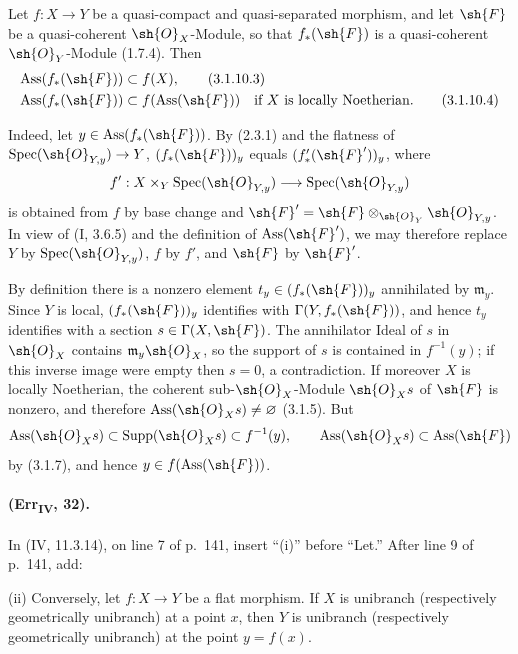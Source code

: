 \begin{remark}[3.1.10.2]
Let $f:X\to Y$ be a quasi-compact and quasi-separated morphism, and let
$\sh{F}$ be a quasi-coherent $\sh{O}_X$-Module, so that $f_*(\sh{F})$
is a quasi-coherent $\sh{O}_Y$-Module (1.7.4).  Then
\begin{align}
 \operatorname{Ass}(f_*(\sh{F}))&\subset f(X), \tag{3.1.10.3}\\
 \operatorname{Ass}(f_*(\sh{F}))&\subset f(\operatorname{Ass}(\sh{F}))
       \quad\text{if $X$ is locally Noetherian}. \tag{3.1.10.4}
\end{align}

Indeed, let $y\in\operatorname{Ass}(f_*(\sh{F}))$.  By (2.3.1) and the
flatness of $\operatorname{Spec}(\sh{O}_{Y,y})\to Y$,
$(f_*(\sh{F}))_y$ equals $(f'_*(\sh{F}'))_y$, where
\[
 f':X\times_Y\operatorname{Spec}(\sh{O}_{Y,y})
       \longrightarrow\operatorname{Spec}(\sh{O}_{Y,y})
\]
is obtained from $f$ by base change and
$\sh{F}'=\sh{F}\otimes_{\sh{O}_Y}\sh{O}_{Y,y}$.  In view of (I, 3.6.5)
and the definition of $\operatorname{Ass}(\sh{F}')$, we may therefore
replace $Y$ by $\operatorname{Spec}(\sh{O}_{Y,y})$, $f$ by $f'$, and
$\sh{F}$ by $\sh{F}'$.

By definition there is a nonzero element
$t_y\in(f_*(\sh{F}))_y$ annihilated by $\mathfrak m_y$.  Since $Y$ is
local, $(f_*(\sh{F}))_y$ identifies with
$\Gamma(Y,f_*(\sh{F}))$, and hence $t_y$ identifies with a section
$s\in\Gamma(X,\sh{F})$.  The annihilator Ideal of $s$ in $\sh{O}_X$
contains $\mathfrak m_y\sh{O}_X$, so the support of $s$ is contained in
$f^{-1}(y)$; if this inverse image were empty then $s=0$, a
contradiction.  If moreover $X$ is locally Noetherian, the coherent
sub-$\sh{O}_X$-Module $\sh{O}_Xs$ of $\sh{F}$ is nonzero, and therefore
$\operatorname{Ass}(\sh{O}_Xs)\neq\varnothing$ (3.1.5).  But
\[
 \operatorname{Ass}(\sh{O}_Xs)\subset\operatorname{Supp}(\sh{O}_Xs)
 \subset f^{-1}(y),
 \qquad
 \operatorname{Ass}(\sh{O}_Xs)\subset\operatorname{Ass}(\sh{F})
\]
by (3.1.7), and hence $y\in f(\operatorname{Ass}(\sh{F}))$.
\end{remark}

\paragraph{(Err\textsubscript{IV}, 32).}
In (IV, 11.3.14), on line 7 of p.~141, insert ``(i)'' before ``Let.''
After line 9 of p.~141, add:

\smallskip
\noindent
\textup{(ii)} Conversely, let $f:X\to Y$ be a flat morphism.  If $X$
is unibranch (respectively geometrically unibranch) at a point $x$, then
$Y$ is unibranch (respectively geometrically unibranch) at the point
$y=f(x)$.

